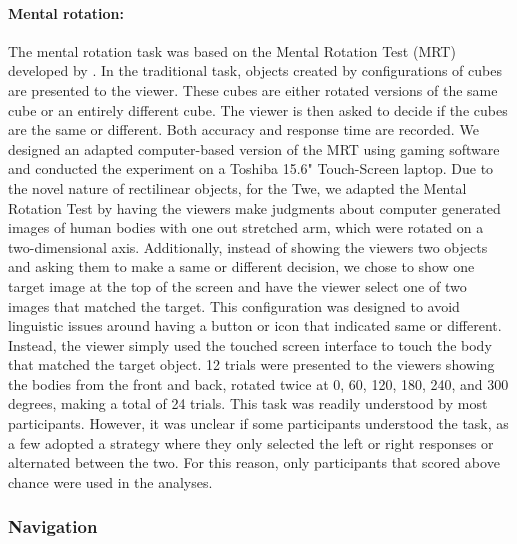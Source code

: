 \paragraph{Mental rotation:}  The mental rotation task was based on the Mental Rotation Test (MRT) developed by \citep{shepard1971mental}. In the traditional task, objects created by configurations of cubes are presented to the viewer. These cubes are either rotated versions of the same cube or an entirely different cube. The viewer is then asked to decide if the cubes are the same or different. Both accuracy and response time are recorded. We designed an adapted computer-based version of the MRT using gaming software \citep{unity14} and conducted the experiment on a Toshiba 15.6" Touch-Screen laptop.  Due to the novel nature of rectilinear objects, for the Twe, we adapted the Mental Rotation Test by having the viewers make judgments about computer generated images of human bodies with one out stretched arm, which were rotated on a two-dimensional axis. Additionally, instead of showing the viewers two objects and asking them to make a same or different decision, we chose to show one target image at the top of the screen and have the viewer select one of two images that matched the target. This configuration was designed to avoid linguistic issues around having a button or icon that indicated same or different. Instead, the viewer simply used the touched screen interface to touch the body that matched the target object. 12 trials were presented to the viewers showing the bodies from the front and back, rotated twice at 0, 60, 120, 180, 240, and 300 degrees, making a total of 24 trials. This task was readily understood by most participants. However, it was unclear if some participants understood the task, as a few adopted a strategy where they only selected the left or right responses or alternated between the two. For this reason, only participants that scored above chance were used in the analyses. 

		\subsubsection{Navigation}
		\label{sec:2.2.2}
